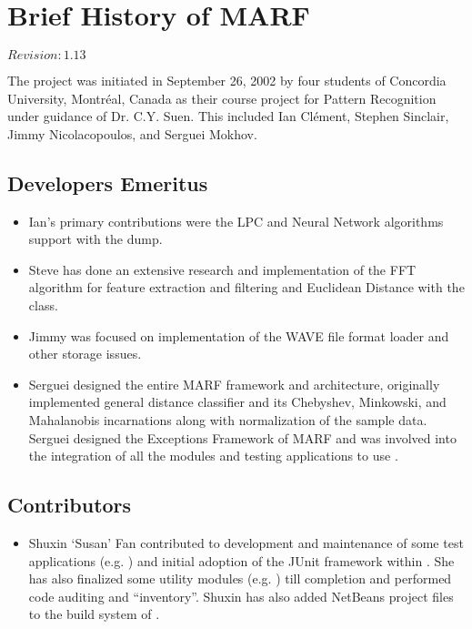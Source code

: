 \section{Brief History of MARF}

$Revision: 1.13 $

The {\marf} project was initiated in September 26, 2002 by four students of
Concordia University, Montr\'eal, Canada as their course project for Pattern Recognition under
guidance of Dr. C.Y. Suen. This included Ian Cl\'ement, Stephen Sinclair,
Jimmy Nicolacopoulos, and Serguei Mokhov.

\subsection{Developers Emeritus}

\begin{itemize}
\item
Ian's primary contributions were the
LPC and Neural Network algorithms support with the  dump.

\item
Steve has done an extensive
research and implementation of the FFT algorithm for feature extraction
and filtering and Euclidean Distance with the  class.

\item
Jimmy was focused on implementation of the WAVE file format
loader and other storage issues.

\item
Serguei designed the entire MARF framework and architecture,
originally implemented general distance classifier and its Chebyshev, Minkowski,
and Mahalanobis incarnations along with normalization of the sample data. Serguei
designed the Exceptions Framework of MARF and was involved into the integration
of all the modules and testing applications to use {\marf}.
\end{itemize}

\subsection{Contributors}

\begin{itemize}
\item
	Shuxin `Susan' Fan contributed to development and maintenance of some test applications
	(e.g. ) and initial adoption of the JUnit framework \cite{junit} within {\marf}.
	She has also finalized some utility modules (e.g. )
	till completion and performed {\marf} code auditing and ``inventory''.
	Shuxin has also added NetBeans project files to the build system of {\marf}.

\end{itemize}

